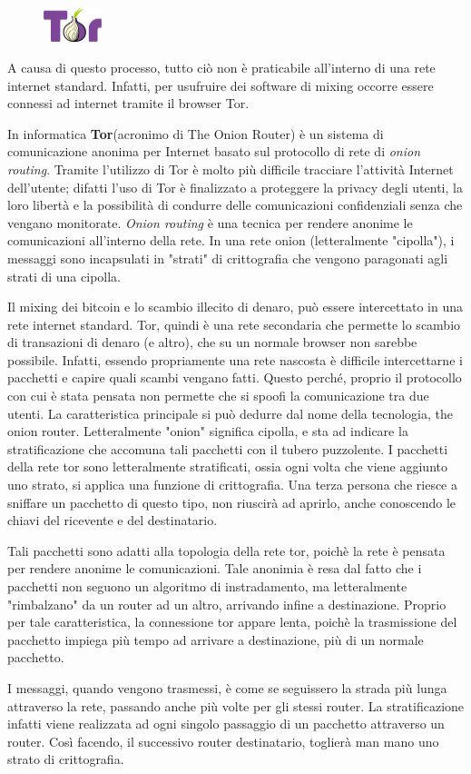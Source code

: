 \begin{figure}
	\vspace{-20pt}
	\includegraphics[width=0.15\textwidth]{figure/torlogo}
\end{figure}
A causa di questo processo, tutto ciò non è praticabile all'interno di una rete internet standard. Infatti, per usufruire dei software di mixing occorre essere connessi ad internet tramite il browser Tor.

In informatica \textbf{Tor}(acronimo di The Onion Router) è un sistema di comunicazione anonima per Internet basato sul protocollo di rete di \textit{onion routing}. Tramite l'utilizzo di Tor è molto più difficile tracciare l'attività Internet dell'utente; difatti l'uso di Tor è finalizzato a proteggere la privacy degli utenti, la loro libertà e la possibilità di condurre delle comunicazioni confidenziali senza che vengano monitorate. \textit{Onion routing} è una tecnica per rendere anonime le comunicazioni all'interno della rete. In una rete onion (letteralmente "cipolla"), i messaggi sono incapsulati in "strati" di crittografia che vengono paragonati agli strati di una cipolla. \cite{wiki:tor}

Il mixing dei bitcoin e lo scambio illecito di denaro, può essere intercettato in una rete internet standard. Tor, quindi è una rete secondaria che permette lo scambio di transazioni di denaro (e altro), che su un normale browser non sarebbe possibile. Infatti, essendo propriamente una rete nascosta è difficile intercettarne i pacchetti e capire quali scambi vengano fatti. Questo perché, proprio il protocollo con cui è stata pensata non permette che si spoofi la comunicazione tra due utenti. La caratteristica principale si può dedurre dal nome della tecnologia, the onion router. Letteralmente "onion" significa cipolla, e sta ad indicare la stratificazione che accomuna tali pacchetti con il tubero puzzolente. 
I pacchetti della rete tor sono letteralmente stratificati, ossia ogni volta che viene aggiunto uno strato, si applica una funzione di crittografia. Una terza persona che riesce a sniffare un pacchetto di questo tipo, non riuscirà ad aprirlo, anche conoscendo le chiavi del ricevente e del destinatario.

Tali pacchetti sono adatti alla topologia della rete tor, poichè la rete è pensata per rendere anonime le comunicazioni. Tale anonimia è resa dal fatto che i pacchetti non seguono un algoritmo di instradamento, ma letteralmente "rimbalzano" da un router ad un altro, arrivando infine a destinazione. Proprio per tale caratteristica, la connessione tor appare lenta, poichè la trasmissione del pacchetto impiega più tempo ad arrivare a destinazione, più di un normale pacchetto.

I messaggi, quando vengono trasmessi, è come se seguissero la strada più lunga attraverso la rete, passando anche più volte per gli stessi router. La stratificazione infatti viene realizzata ad ogni singolo passaggio di un pacchetto attraverso un router. Così facendo, il successivo router destinatario, toglierà man mano uno strato di crittografia.
